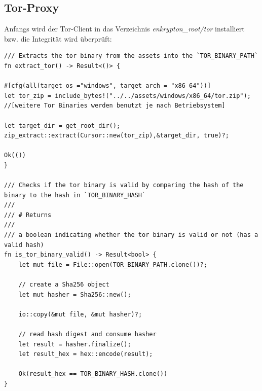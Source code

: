 \documentclass[a4paper,ngerman, headheight=28pt,12pt]{scrartcl}
\begin{document}
\subsection{Tor-Proxy}
Anfangs wird der Tor-Client in das Verzeichnis \textit{enkrypton\_root/tor} installiert bzw. die Integrität wird überprüft:
\begin{verbatim}
/// Extracts the tor binary from the assets into the `TOR_BINARY_PATH`
fn extract_tor() -> Result<()> {

#[cfg(all(target_os ="windows", target_arch = "x86_64"))]
let tor_zip = include_bytes!("../../assets/windows/x86_64/tor.zip");
//[weitere Tor Binaries werden benutzt je nach Betriebsystem]

let target_dir = get_root_dir();
zip_extract::extract(Cursor::new(tor_zip),&target_dir, true)?;

Ok(())
}

/// Checks if the tor binary is valid by comparing the hash of the binary to the hash in `TOR_BINARY_HASH`
/// 
/// # Returns
/// 
/// a boolean indicating whether the tor binary is valid or not (has a valid hash)
fn is_tor_binary_valid() -> Result<bool> {
    let mut file = File::open(TOR_BINARY_PATH.clone())?;

    // create a Sha256 object
    let mut hasher = Sha256::new();

    io::copy(&mut file, &mut hasher)?;

    // read hash digest and consume hasher
    let result = hasher.finalize();
    let result_hex = hex::encode(result);

    Ok(result_hex == TOR_BINARY_HASH.clone())
}
\end{verbatim}
\end{document}
